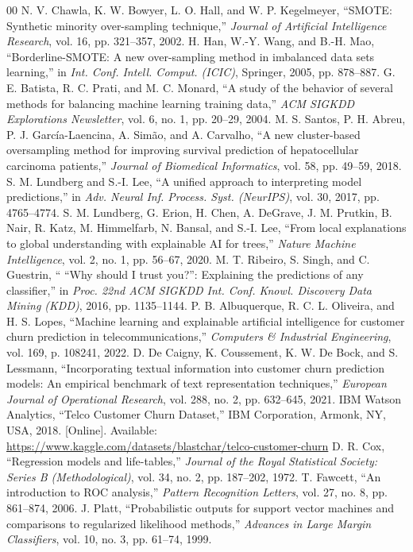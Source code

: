 \documentclass[conference]{IEEEtran}
\begin{document}
\begin{thebibliography}{00}
 N. V. Chawla, K. W. Bowyer, L. O. Hall, and W. P. Kegelmeyer, ``SMOTE: Synthetic minority over-sampling technique,'' \emph{Journal of Artificial Intelligence Research}, vol. 16, pp. 321--357, 2002.
 H. Han, W.-Y. Wang, and B.-H. Mao, ``Borderline-SMOTE: A new over-sampling method in imbalanced data sets learning,'' in \emph{Int. Conf. Intell. Comput. (ICIC)}, Springer, 2005, pp. 878--887.
 G. E. Batista, R. C. Prati, and M. C. Monard, ``A study of the behavior of several methods for balancing machine learning training data,'' \emph{ACM SIGKDD Explorations Newsletter}, vol. 6, no. 1, pp. 20--29, 2004.
 M. S. Santos, P. H. Abreu, P. J. García-Laencina, A. Simão, and A. Carvalho, ``A new cluster-based oversampling method for improving survival prediction of hepatocellular carcinoma patients,'' \emph{Journal of Biomedical Informatics}, vol. 58, pp. 49--59, 2018.
 S. M. Lundberg and S.-I. Lee, ``A unified approach to interpreting model predictions,'' in \emph{Adv. Neural Inf. Process. Syst. (NeurIPS)}, vol. 30, 2017, pp. 4765--4774.
 S. M. Lundberg, G. Erion, H. Chen, A. DeGrave, J. M. Prutkin, B. Nair, R. Katz, M. Himmelfarb, N. Bansal, and S.-I. Lee, ``From local explanations to global understanding with explainable AI for trees,'' \emph{Nature Machine Intelligence}, vol. 2, no. 1, pp. 56--67, 2020.
 M. T. Ribeiro, S. Singh, and C. Guestrin, `` ``Why should I trust you?'': Explaining the predictions of any classifier,'' in \emph{Proc. 22nd ACM SIGKDD Int. Conf. Knowl. Discovery Data Mining (KDD)}, 2016, pp. 1135--1144.
 P. B. Albuquerque, R. C. L. Oliveira, and H. S. Lopes, ``Machine learning and explainable artificial intelligence for customer churn prediction in telecommunications,'' \emph{Computers \& Industrial Engineering}, vol. 169, p. 108241, 2022.
 D. De Caigny, K. Coussement, K. W. De Bock, and S. Lessmann, ``Incorporating textual information into customer churn prediction models: An empirical benchmark of text representation techniques,'' \emph{European Journal of Operational Research}, vol. 288, no. 2, pp. 632--645, 2021.
 IBM Watson Analytics, ``Telco Customer Churn Dataset,'' IBM Corporation, Armonk, NY, USA, 2018. [Online]. Available: \url{https://www.kaggle.com/datasets/blastchar/telco-customer-churn}
 D. R. Cox, ``Regression models and life-tables,'' \emph{Journal of the Royal Statistical Society: Series B (Methodological)}, vol. 34, no. 2, pp. 187--202, 1972.
 T. Fawcett, ``An introduction to ROC analysis,'' \emph{Pattern Recognition Letters}, vol. 27, no. 8, pp. 861--874, 2006.
 J. Platt, ``Probabilistic outputs for support vector machines and comparisons to regularized likelihood methods,'' \emph{Advances in Large Margin Classifiers}, vol. 10, no. 3, pp. 61--74, 1999.
\end{thebibliography}
\end{document}

